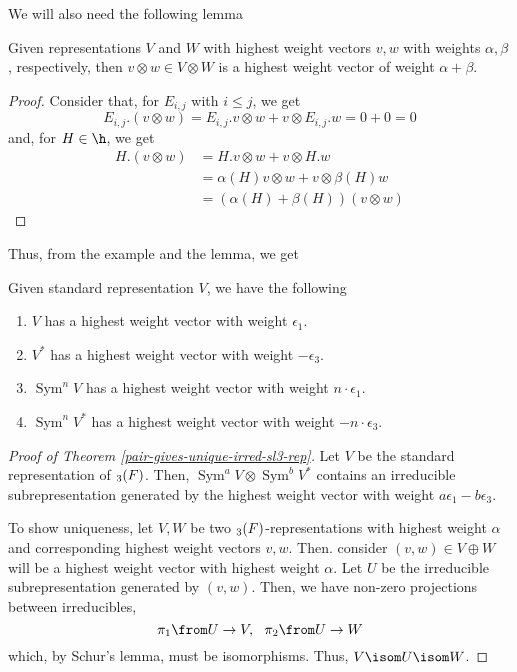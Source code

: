 \documentclass[11pt,leqno,oneside]{amsart}
\numberwithin{thm}{section}
\begin{document}
We will also need the following lemma
\begin{lem}
  Given representations \(V\) and \(W\) with highest weight vectors
  \(v,w\) with weights \(\alpha,\beta\), respectively, then \(v
  \otimes w \in V \otimes W\) is a highest weight vector of weight
  \(\alpha + \beta\).
\end{lem}
\begin{proof}
  Consider that, for \(E_{i,j}\) with \(i \leq j\), we get \[
    E_{i,j}.(v \otimes w) = E_{i,j}.v \otimes w + v \otimes E_{i,j}.w
    = 0 + 0 = 0
  \]
  and, for \(H \in \h\), we get
  \begin{align*}
    H.(v \otimes w) & = H.v \otimes w + v \otimes H.w \\
                    & = \alpha(H)v \otimes w + v \otimes \beta(H) w \\
    & = (\alpha(H)+\beta(H)) (v \otimes w)
  \end{align*}
\end{proof}
Thus, from the example and the lemma, we get
\begin{prop}
  Given standard representation \(V\), we have the following
  \begin{enumerate}
  \item \(V\) has a highest weight vector with weight
    \(\epsilon_1\).
  \item \(V^*\) has a highest weight vector with weight
    \(-\epsilon_3\).
  \item \(\operatorname{Sym}^n V\) has a highest weight vector with
    weight \(n \cdot \epsilon_1\).
  \item \(\operatorname{Sym}^n V^*\) has a highest weight vector with
    weight \(-n\cdot \epsilon_3\).
  \end{enumerate}
\end{prop}
\begin{proof}[Proof of Theorem \ref{pair-gives-unique-irred-sl3-rep}]
  Let \(V\) be the standard representation of \(\sl_3(F)\). Then,
  \(\operatorname{Sym}^a V \otimes \operatorname{Sym}^b V^*\) contains
  an irreducible subrepresentation generated by the highest weight
  vector with weight \(a \epsilon_1 - b \epsilon_3\).

  To show uniqueness, let \(V,W\) be two \(\sl_3(F)\)-representations
  with highest weight \(\alpha\) and corresponding highest weight
  vectors \(v,w\). Then. consider \((v,w) \in V \oplus W\) will be a
  highest weight vector with highest weight \(\alpha\). Let \(U\) be
  the irreducible subrepresentation generated by \((v,w)\). Then, we
  have non-zero projections between irreducibles, \[
    \pi_1 \from U \to V, \ \ \pi_2 \from U \to W
  \]
  which, by Schur's lemma, must be isomorphisms. Thus, \(V \isom U
  \isom W\).
\end{proof}
\end{document}
